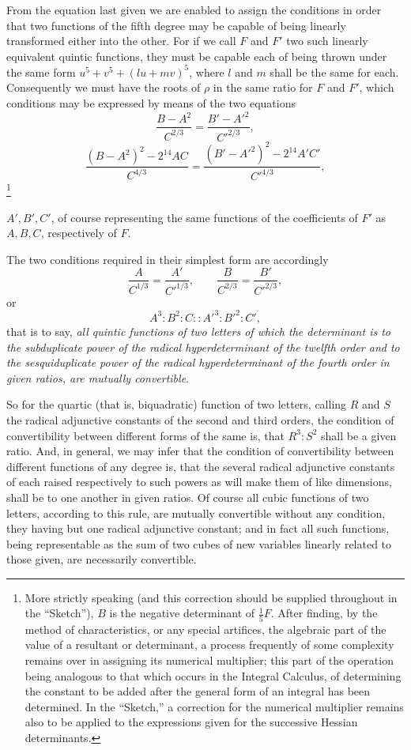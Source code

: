 \documentclass[11pt]{article}
\newcommand{\sourcepage}[1]{\marginpar{\scriptsize p.~#1}}
\begin{document}
{{From the equation last given we are enabled to assign the conditions in order that two functions of the fifth degree may be capable of being linearly transformed either into the other. For if we call $F$ and $F'$ two such linearly equivalent quintic functions, they must be capable each of being thrown under the same form $u^5+v^5+(lu+mv)^5$, where $l$ and $m$ shall be the same for each. Consequently we must have the roots of $\rho$ in the same ratio for $F$ and $F'$, which conditions may be expressed by means of the two equations
\[
 \frac{B-A^2}{C^{2/3}}=\frac{B'-A'^2}{C'^{2/3}},
\]
\[
 \frac{(B-A^2)^2-2^{14}AC}{C^{4/3}}
 =
 \frac{(B'-A'^2)^2-2^{14}A'C'}{C'^{4/3}},
\]
\footnote{More strictly speaking (and this correction should be supplied throughout in the ``Sketch''), $B$ is the negative determinant of $\frac15 F$. After finding, by the method of characteristics, or any special artifices, the algebraic part of the value of a resultant or determinant, a process frequently of some complexity remains over in assigning its numerical multiplier; this part of the operation being analogous to that which occurs in the Integral Calculus, of determining the constant to be added after the general form of an integral has been determined. In the ``Sketch,'' a correction for the numerical multiplier remains also to be applied to the expressions given for the successive Hessian determinants.}

\sourcepage{206}
$A',B',C'$, of course representing the same functions of the coefficients of $F'$ as $A,B,C$, respectively of $F$.

The two conditions required in their simplest form are accordingly
\[
 \frac{A}{C^{1/3}}=\frac{A'}{C'^{1/3}},
 \qquad
 \frac{B}{C^{2/3}}=\frac{B'}{C'^{2/3}},
\]
or
\[
 A^3:B^2:C::A'^3:B'^2:C',
\]
that is to say, \emph{all quintic functions of two letters of which the determinant is to the subduplicate power of the radical hyperdeterminant of the twelfth order and to the sesquiduplicate power of the radical hyperdeterminant of the fourth order in given ratios, are mutually convertible}.

So for the quartic (that is, biquadratic) function of two letters, calling $R$ and $S$ the radical adjunctive constants of the second and third orders, the condition of convertibility between different forms of the same is, that $R^3:S^2$ shall be a given ratio. And, in general, we may infer that the condition of convertibility between different functions of any degree is, that the several radical adjunctive constants of each raised respectively to such powers as will make them of like dimensions, shall be to one another in given ratios. Of course all cubic functions of two letters, according to this rule, are mutually convertible without any condition, they having but one radical adjunctive constant; and in fact all such functions, being representable as the sum of two cubes of new variables linearly related to those given, are necessarily convertible.

}}
\end{document}
